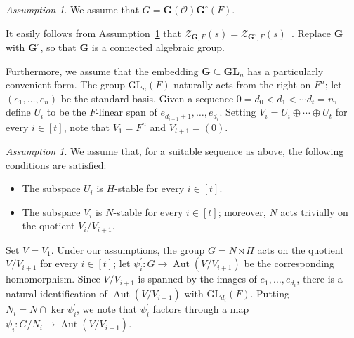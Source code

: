 \documentclass[11pt,a4paper]{amsart}
\theoremstyle{plain}
\theoremstyle{remark}
\newtheorem{asm}[thm]{Assumption}
\DeclareMathOperator{\Aut}{Aut}
\begin{document}
\begin{asm} \label{first.assumption}
We assume that $G = \mathbf{G}(\mathcal{O}) \mathbf{G}^\circ (F)$.
\end{asm}
It easily follows from Assumption~\ref{first.assumption} that $\mathcal{Z}_{\mathbf{G}, F}(s) = \mathcal{Z}_{\mathbf{G}^\circ, F}(s)$~\cite[Proposition~2.1]{duSLubotzky/96}.  Replace $\mathbf{G}$ with $\mathbf{G}^\circ$, so that $\mathbf{G}$ is a connected algebraic group.  

Furthermore, we assume that the embedding $\mathbf{G} \subseteq \mathbf{GL}_n$ has a particularly convenient form.  The group $\mathrm{GL}_n(F)$ naturally acts from the right on $F^n$; let $(e_1, \dots, e_n)$ be the standard basis.  Given a sequence $0 = d_0 < d_1 < \cdots d_t = n$, define $U_i$ to be the $F$-linear span of $e_{d_{i-1} + 1}, \dots, e_{d_i}$.  Setting $V_i = U_i \oplus \cdots \oplus U_t$ for every $i \in [t]$, note that $V_1 = F^n$ and $V_{t+1} = (0)$.  

\begin{asm} \label{second.assumption}
We assume that, for a suitable sequence as above, the following conditions are satisfied: 
\begin{itemize}
\item The subspace $U_i$ is $H$-stable for every $i \in [t]$.
\item The subspace $V_i$ is $N$-stable for every $i \in [t]$; moreover, $N$ acts trivially on the quotient $V_i / V_{i+1}$.
\end{itemize}
\end{asm}

Set $V = V_1$.  Under our assumptions, the group $G = N \rtimes H$ acts on the quotient $V/V_{i+1}$ for every $i \in [t]$; let $\psi_i^\prime : G \to \Aut(V/V_{i+1})$ be the corresponding homomorphism.  Since $V/V_{i+1}$ is spanned by the images of $e_1, \dots, e_{d_{i}}$, there is a natural identification of $\Aut(V/V_{i+1})$ with $\mathrm{GL}_{d_{i}}(F)$.  Putting $N_{i} = N \cap \ker \psi_i^\prime$, we note that $\psi_i^\prime$ factors through a map $\psi_i : G/N_{i} \to \Aut (V/V_{i+1})$.  
\end{document}
